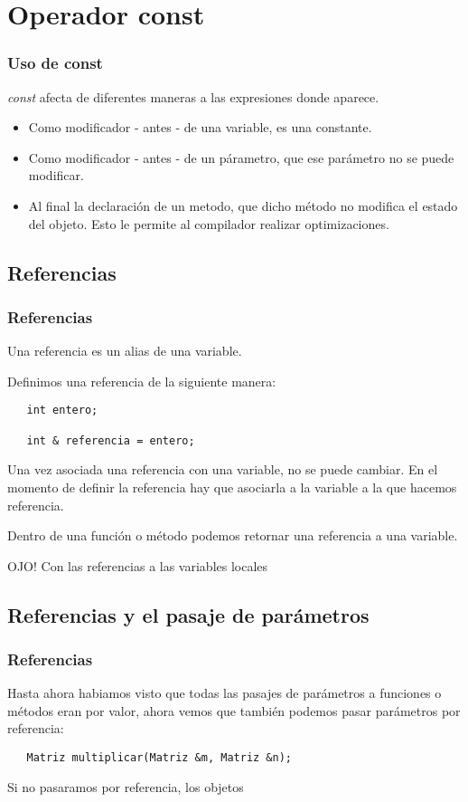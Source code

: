 \documentclass{beamer}
\begin{document}
\section{Operador const}
\begin{frame}
\frametitle{Uso de const}
  \emph{const} afecta de diferentes maneras a las expresiones donde aparece.

\begin{itemize}
 \item Como modificador - antes - de una variable, es una constante.
 \item Como modificador - antes - de un párametro, que ese parámetro no se puede modificar.

 \item Al final la declaración de un metodo, que dicho método no modifica el estado del objeto. Esto le permite al compilador realizar optimizaciones.
\end{itemize}
\end{frame}

\subsection{Referencias}
\begin{frame}[fragile]
\frametitle{Referencias}
  
 Una referencia es un alias de una variable.

 Definimos una referencia de la siguiente manera:

\begin{verbatim}
   int entero;

   int & referencia = entero;
\end{verbatim}

Una vez asociada una referencia con una variable, no se puede cambiar. En el momento de definir la referencia hay que asociarla a la variable a la que hacemos referencia.

Dentro de una función o método podemos retornar una referencia a una variable.


\begin{block}
 OJO! Con las referencias a las variables locales
\end{block}

\end{frame}

\subsection{Referencias y el pasaje de parámetros}
\begin{frame}[fragile]
\frametitle{Referencias}

Hasta ahora habiamos visto que todas las pasajes de parámetros a funciones o métodos eran por valor, ahora vemos que también podemos pasar parámetros por referencia:

\begin{verbatim}
   Matriz multiplicar(Matriz &m, Matriz &n);
\end{verbatim}
Si no pasaramos por referencia, los objetos 
\end{frame}
\end{document}

